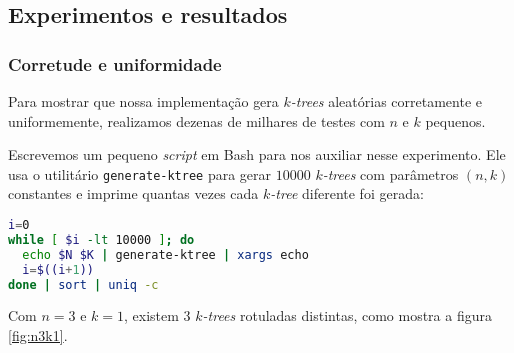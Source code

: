 \subsection{Experimentos e resultados}

\subsubsection{Corretude e uniformidade}

Para mostrar que nossa implementação gera \emph{$k$-trees} aleatórias corretamente e uniformemente, realizamos dezenas de milhares de testes com $n$ e $k$ pequenos.

Escrevemos um pequeno \emph{script} em Bash para nos auxiliar nesse experimento. Ele usa o utilitário {\tt generate-ktree} para gerar $10000$ \emph{$k$-trees} com parâmetros $(n, k)$ constantes e imprime quantas vezes cada \emph{$k$-tree} diferente foi gerada:

\begin{lstlisting}[language=bash]
i=0
while [ $i -lt 10000 ]; do
  echo $N $K | generate-ktree | xargs echo
  i=$((i+1))
done | sort | uniq -c
\end{lstlisting}

Com $n = 3$ e $k = 1$, existem $3$ \emph{$k$-trees} rotuladas distintas, como mostra a figura \ref{fig:n3k1}.

